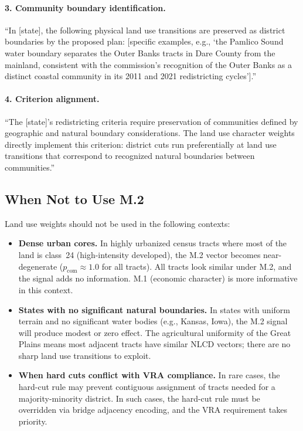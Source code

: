 \paragraph{3. Community boundary identification.}
``In [state], the following physical land use transitions are preserved as
district boundaries by the proposed plan: [specific examples, e.g.,
`the Pamlico Sound water boundary separates the Outer Banks tracts in
Dare County from the mainland, consistent with the commission's recognition
of the Outer Banks as a distinct coastal community in its 2011 and 2021
redistricting cycles'].''

\paragraph{4. Criterion alignment.}
``The [state]'s redistricting criteria require preservation of communities
defined by geographic and natural boundary considerations.
The land use character weights directly implement this criterion: district
cuts run preferentially at land use transitions that correspond to recognized
natural boundaries between communities.''

\subsection{When Not to Use M.2}

Land use weights should not be used in the following contexts:

\begin{itemize}
  \item \textbf{Dense urban cores.}
    In highly urbanized census tracts where most of the land is class~24
    (high-intensity developed), the M.2 vector becomes near-degenerate
    ($p_{\mathrm{com}} \approx 1.0$ for all tracts).
    All tracts look similar under M.2, and the signal adds no information.
    M.1 (economic character) is more informative in this context.
  \item \textbf{States with no significant natural boundaries.}
    In states with uniform terrain and no significant water bodies
    (e.g., Kansas, Iowa), the M.2 signal will produce modest or zero
    effect.
    The agricultural uniformity of the Great Plains means most adjacent
    tracts have similar NLCD vectors; there are no sharp land use
    transitions to exploit.
  \item \textbf{When hard cuts conflict with VRA compliance.}
    In rare cases, the hard-cut rule may prevent contiguous assignment
    of tracts needed for a majority-minority district.
    In such cases, the hard-cut rule must be overridden via bridge
    adjacency encoding, and the VRA requirement takes priority.
\end{itemize}
